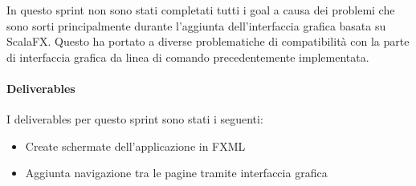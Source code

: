 In questo sprint non sono stati completati tutti i goal a causa dei problemi che sono sorti principalmente durante l'aggiunta dell'interfaccia grafica basata su ScalaFX. Questo ha portato a diverse problematiche di compatibilità con la parte di interfaccia grafica da linea di comando precedentemente implementata.
\paragraph{Deliverables} 
I deliverables per questo sprint sono stati i seguenti:
\begin{itemize}
    \item Create schermate dell'applicazione in FXML
    \item Aggiunta navigazione tra le pagine tramite interfaccia grafica
\end{itemize}